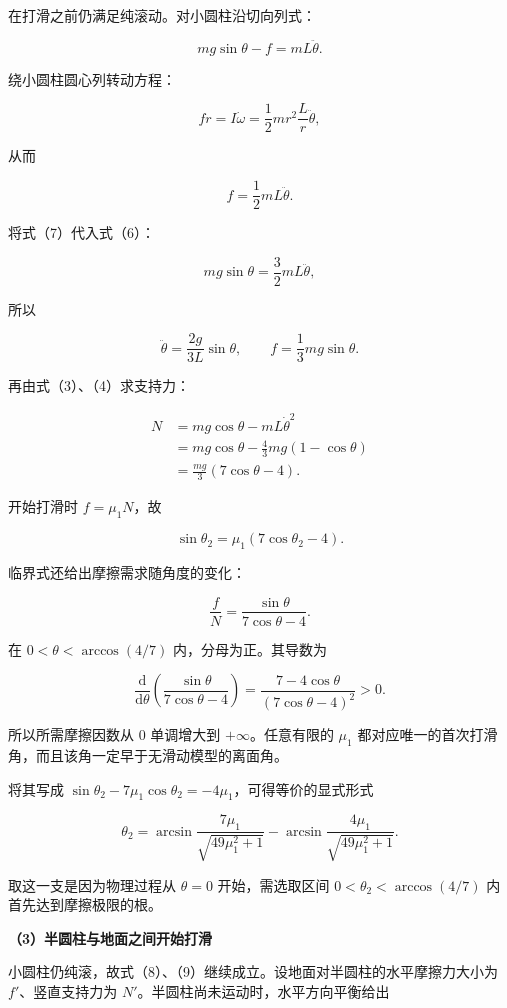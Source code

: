 \documentclass[12pt,a4paper,UTF8]{ctexart}
\begin{document}
在打滑之前仍满足纯滚动。对小圆柱沿切向列式：

\[mg\sin\theta-f=mL\ddot\theta. \tag{6}\]

绕小圆柱圆心列转动方程：

\[fr=I\dot\omega
=\frac12mr^2\frac{L}{r}\ddot\theta,\]

从而

\[f=\frac12mL\ddot\theta. \tag{7}\]

将式（7）代入式（6）：

\[mg\sin\theta=\frac32mL\ddot\theta,\]

所以

\[\ddot\theta=\frac{2g}{3L}\sin\theta,\qquad
f=\frac13mg\sin\theta. \tag{8}\]

再由式（3）、（4）求支持力：

\[\begin{aligned}
N
&=mg\cos\theta-mL\dot\theta^2\\
&=mg\cos\theta-\frac43mg(1-\cos\theta)\\
&=\frac{mg}{3}(7\cos\theta-4).
\end{aligned} \tag{9}\]

开始打滑时 \(f=\mu_1N\)，故

\[\boxed{\sin\theta_2=\mu_1(7\cos\theta_2-4)}. \tag{10}\]

临界式还给出摩擦需求随角度的变化：

\[\frac{f}{N}
=\frac{\sin\theta}{7\cos\theta-4}.\]

在 \(0<\theta<\arccos(4/7)\) 内，分母为正。其导数为

\[\frac{\mathrm d}{\mathrm d\theta}
\left(\frac{\sin\theta}{7\cos\theta-4}\right)
=\frac{7-4\cos\theta}{(7\cos\theta-4)^2}>0.\]

所以所需摩擦因数从 \(0\) 单调增大到 \(+\infty\)。任意有限的 \(\mu_1\)
都对应唯一的首次打滑角，而且该角一定早于无滑动模型的离面角。

将其写成 \(\sin\theta_2-7\mu_1\cos\theta_2=-4\mu_1\)，可得等价的显式形式

\[\boxed{
\theta_2=\arcsin\frac{7\mu_1}{\sqrt{49\mu_1^2+1}}
-\arcsin\frac{4\mu_1}{\sqrt{49\mu_1^2+1}}
}. \tag{11}\]

取这一支是因为物理过程从 \(\theta=0\) 开始，需选取区间
\(0<\theta_2<\arccos(4/7)\) 内首先达到摩擦极限的根。

\textbf{（3）半圆柱与地面之间开始打滑}

小圆柱仍纯滚，故式（8）、（9）继续成立。设地面对半圆柱的水平摩擦力大小为
\(f'\)、竖直支持力为 \(N'\)。半圆柱尚未运动时，水平方向平衡给出
\end{document}
